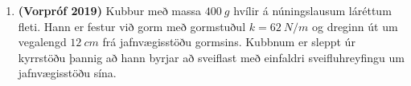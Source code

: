 \begin{enumerate}[label = \textbf{Dæmi \thechapter.\arabic*.}]
\item \textbf{(Vorpróf 2019)} Kubbur með massa $\SI{400}{g}$ hvílir á núningslausum láréttum fleti. Hann er festur við gorm með gormstuðul $k = \SI{62}{N/m}$ og dreginn út um vegalengd $\SI{12}{cm}$ frá jafnvægisstöðu gormsins. Kubbnum er sleppt úr kyrrstöðu þannig að hann byrjar að sveiflast með einfaldri sveifluhreyfingu um jafnvægisstöðu sína. 

\vspace{0.1cm}


\end{enumerate}
